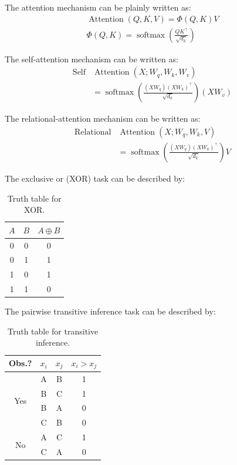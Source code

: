 \documentclass[12pt]{article}
\begin{document}
The attention mechanism can be plainly written as:
\begin{gather*} 
\operatorname{Attention}(Q, K, V)=\Phi( Q,K ) V\\
\Phi(Q,K)=\operatorname{softmax}\!\left(\frac{QK^\top}{\sqrt{d_k}}\right)
\end{gather*}

The self-attention mechanism can be written as:
\begin{align*} 
\operatorname{Self}&\operatorname{Attention}(X; W_q, W_k, W_v) \\
&= \operatorname{softmax}\!\left(\frac{(XW_q)(XW_k)^\top}{\sqrt{d_k}}\right)(XW_v)
\end{align*}

The relational-attention mechanism can be written as:
\begin{align*} 
\operatorname{Relational}&\operatorname{Attention}(X; W_q, W_k, V) \\
&= \operatorname{softmax}\!\left(\frac{(XW_q)(XW_k)^\top}{\sqrt{d_k}}\right)V
\end{align*}

The exclusive or (XOR) task can be described by:
\begin{table}[h]
\centering
\begin{tabular}{c c | c}
\hline
$A$ & $B$ & $A \oplus B$ \\
\hline
0 & 0 & 0 \\
0 & 1 & 1 \\
1 & 0 & 1 \\
1 & 1 & 0 \\
\hline
\end{tabular}
\caption{Truth table for XOR.}
\end{table}

The pairwise transitive inference task can be described by:
\begin{table}[h]
\centering
\begin{tabular}{c c c | c}
\hline
Obs.? & $x_i$ & $x_j$ & $x_i > x_j$ \\
\hline
\multirow{4}{*}{Yes} 
  & A & B & 1 \\
  & B & C & 1 \\
  & B & A & 0 \\
  & C & B & 0 \\
\hline
\multirow{2}{*}{No} 
  & A & C & 1 \\
  & C & A & 0 \\
\hline
\end{tabular}
\caption{Truth table for transitive inference.}
\end{table}
\end{document}
